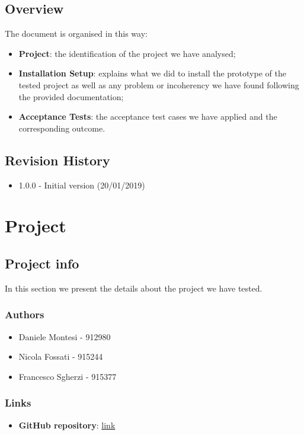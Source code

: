 \documentclass{article}
\begin{document}
\subsection{Overview} 
The document is organised in this way:
\begin{itemize}
	\item \textbf{Project}: the identification of the project we have analysed;
	\item \textbf{Installation Setup}: explains what we did to install the prototype of the tested project as well as any problem or incoherency we have found following the provided documentation;
	\item \textbf{Acceptance Tests}: the acceptance test cases we have applied and the corresponding outcome.
\end{itemize}

\subsection{Revision History}
\begin{itemize}
	\item 1.0.0 - Initial version (20/01/2019)
\end{itemize}

\newpage
\section{Project}
\subsection{Project info}
In this section we present the details about the project we have tested.
\subsubsection{Authors}
\begin{itemize}
	\item Daniele Montesi - 912980
	\item Nicola Fossati - 915244
	\item Francesco Sgherzi - 915377
\end{itemize}

\subsubsection{Links}
\begin{itemize}
	\item \textbf{GitHub repository}: \href{https://github.com/danmontesi/FossatiMontesiSgherzi}{link}
\end{itemize}
\end{document}
